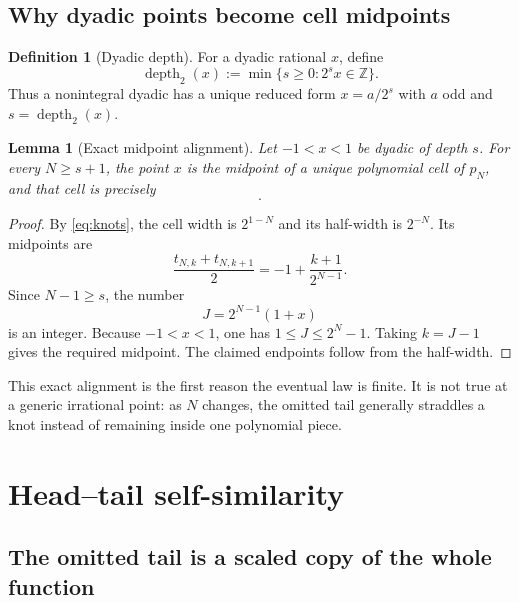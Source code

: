 \documentclass[11pt,oneside]{article}
\numberwithin{equation}{section}
\newtheorem{lemma}[theorem]{Lemma}
\theoremstyle{definition}
\newtheorem{definition}[theorem]{Definition}
\theoremstyle{remark}
\newcommand{\Z}{\mathbb{Z}}
\newcommand{\depth}{\operatorname{depth}_2}
\begin{document}
\subsection{Why dyadic points become cell midpoints}

\begin{definition}[Dyadic depth]
For a dyadic rational $x$, define
\begin{equation}
 \depth(x):=\min\{s\ge0:2^sx\in\Z\}.
 \label{eq:dyadic-depth}
\end{equation}
Thus a nonintegral dyadic has a unique reduced form $x=a/2^s$ with $a$ odd and
$s=\depth(x)$.
\end{definition}

\begin{lemma}[Exact midpoint alignment]
Let $-1<x<1$ be dyadic of depth $s$.  For every $N\ge s+1$, the point $x$ is the
midpoint of a unique polynomial cell of $p_N$, and that cell is precisely
\begin{equation}
 [x-2^{-N},\,x+2^{-N}].
 \label{eq:aligned-cell}
\end{equation}
\end{lemma}

\begin{proof}
By \eqref{eq:knots}, the cell width is $2^{1-N}$ and its half-width is $2^{-N}$.
Its midpoints are
\[
 \frac{t_{N,k}+t_{N,k+1}}2
 =-1+\frac{k+1}{2^{N-1}}.
\]
Since $N-1\ge s$, the number
\[
 J=2^{N-1}(1+x)
\]
is an integer.  Because $-1<x<1$, one has $1\le J\le2^N-1$.  Taking $k=J-1$
gives the required midpoint.  The claimed endpoints follow from the half-width.
\end{proof}

This exact alignment is the first reason the eventual law is finite.  It is not
true at a generic irrational point: as $N$ changes, the omitted tail generally
straddles a knot instead of remaining inside one polynomial piece.

\section{Head--tail self-similarity}

\subsection{The omitted tail is a scaled copy of the whole function}
\end{document}
